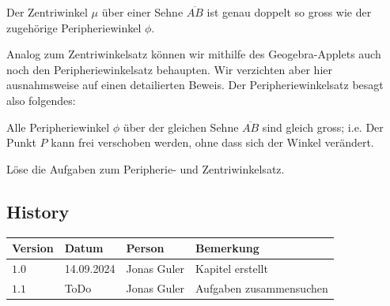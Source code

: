 \documentclass[11pt,oneside]{article}
\begin{document}
	\begin{satz}[Zentriwinkelsatz]
		Der Zentriwinkel $\mu$ über einer Sehne $\overline{AB}$ ist genau doppelt so gross wie der zugehörige Peripheriewinkel $\phi$.
	\end{satz}
	Analog zum Zentriwinkelsatz können wir mithilfe des Geogebra-Applets auch noch den Peripheriewinkelsatz behaupten. Wir verzichten aber hier ausnahmsweise auf einen detailierten Beweis. Der Peripheriewinkelsatz besagt also folgendes:
	\begin{satz}[Peripheriewinkelsatz]
		Alle Peripheriewinkel $\phi$ über der gleichen Sehne $\overline{AB}$ sind gleich gross; i.e. Der Punkt $P$ kann frei verschoben werden, ohne dass sich der Winkel verändert.
	\end{satz}
	\begin{aufgabe}
		Löse die Aufgaben zum Peripherie- und Zentriwinkelsatz.
	\end{aufgabe}


\newpage
\subsection*{History}
\begin{table}[H]
	\centering
	\begin{tabular}{|p{13mm}|p{20mm}|p{30mm}|p{70mm}|}\hline
		Version & Datum & Person & Bemerkung \\\hline
		$1.0$ & 14.09.2024 & Jonas Guler & Kapitel erstellt \\\hline
		$1.1$ & ToDo & Jonas Guler & Aufgaben zusammensuchen \\\hline
	\end{tabular}
\end{table}
\end{document}

